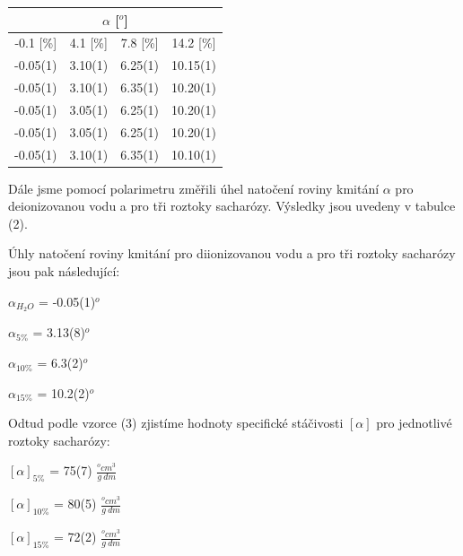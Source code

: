 \documentclass[a4paper,11pt]{article}
\begin{document}
    \hspace{10pt}
    \begin{minipage}[t]{0.5\textwidth} 
            \vspace{-10pt}
            \par \centering
            \begin{tabular}{|c|c|c|c|}
                \hline
                \multicolumn{4}{|c|}{$\alpha$ [$^o$]} \\
                \hline
                -0.1 [\%] & 4.1 [\%] & 7.8 [\%] & 14.2 [\%] \\
                \hline
                -0.05(1) & 3.10(1) & 6.25(1) & 10.15(1) \\
                \hline
                -0.05(1) & 3.10(1) & 6.35(1) & 10.20(1) \\
                \hline
                -0.05(1) & 3.05(1) & 6.25(1) & 10.20(1) \\
                \hline
                -0.05(1) & 3.05(1) & 6.25(1) & 10.20(1) \\
                \hline
                -0.05(1) & 3.10(1) & 6.35(1) & 10.10(1) \\
                \hline
            \end{tabular}
            \captionsetup{justification=centering, font=footnotesize}
            \vspace{10pt}
            \raggedright
            \par Dále jsme pomocí polarimetru změřili úhel natočení roviny kmitání $\alpha$ pro deionizovanou vodu a pro tři roztoky sacharózy. Výsledky jsou uvedeny v tabulce (2). 
            \par Úhly natočení roviny kmitání pro diionizovanou vodu a pro tři roztoky sacharózy jsou pak následující: 
            \begin{center}
                $\alpha_{H_2O}$ = -0.05(1)$^o$
                \vspace{5pt}
                \par $\alpha_{5\%}$ = 3.13(8)$^o$
                \vspace{5pt}
                \par $\alpha_{10\%}$ = 6.3(2)$^o$
                \vspace{5pt}
                \par $\alpha_{15\%}$ = 10.2(2)$^o$
            \end{center}
            \par Odtud podle vzorce (3) zjistíme hodnoty specifické stáčivosti $[\alpha]$ pro jednotlivé roztoky sacharózy:
            \begin{center}
                $[\alpha]_{5\%}$ = 75(7) $\frac{^o cm^3}{g ~dm}$
                \vspace{5pt}
                \par $[\alpha]_{10\%}$ = 80(5) $\frac{^o cm^3}{g ~dm}$
                \vspace{5pt}
                \par $[\alpha]_{15\%}$ = 72(2) $\frac{^o cm^3}{g ~dm}$
            \end{center}

\end{minipage}
\end{document}
